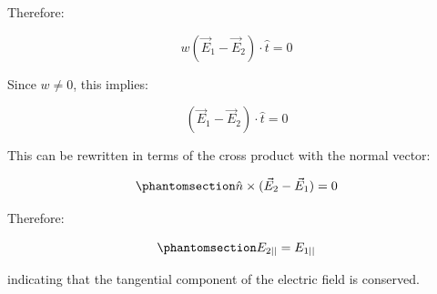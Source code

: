 \documentclass[
  a4paper,
]{book}
\begin{document}
Therefore:

\[
w(\vec{E}_1 - \vec{E}_2) \cdot \hat{t} = 0
\]

Since \(w \neq 0\), this implies:

\[
(\vec{E}_1 - \vec{E}_2) \cdot \hat{t} = 0
\]

This can be rewritten in terms of the cross product with the normal
vector:

\begin{equation}\phantomsection\label{eq-boundary-tangential}{
\hat{n} \times (\vec{E}_2-\vec{E}_1)=0
}\end{equation}

Therefore:

\begin{equation}\phantomsection\label{eq-e-parallel}{
E_{2||}=E_{1||}
}\end{equation}

indicating that the tangential component of the electric field is
conserved.
\end{document}
